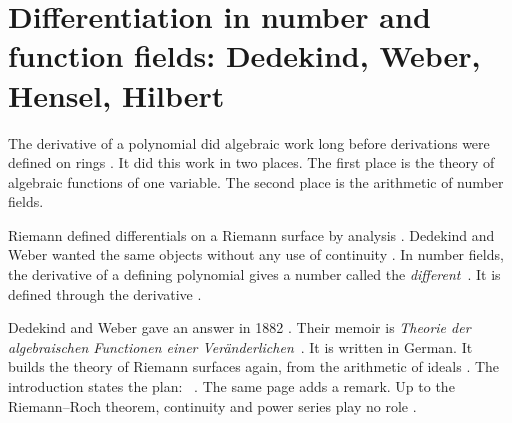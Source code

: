 \section[Differentiation in number and function fields: Dedekind, Weber, Hensel, Hilbert][Number and function fields]{Differentiation in number and function fields: Dedekind, Weber, Hensel, Hilbert}\label{sec:origins:function-fields}

The derivative of a polynomial did algebraic work long before derivations were
defined on rings \cite[\S 3, p.~179]{Hilbert1897}. It did this work in two
places. The first place is the theory of algebraic functions of one variable.
The second place is the arithmetic of number fields.

Riemann defined differentials on a Riemann surface by analysis \cite[\S 3,
p.~179]{Hilbert1897}. Dedekind and Weber wanted the same objects without any
use of continuity \cite[\S 3, p.~179]{Hilbert1897}. In number fields, the
derivative of a defining polynomial gives a number called the
\emph{different}~\cite[\S 3, p.~179]{Hilbert1897}. It is defined through the
derivative \cite[\S 3, p.~179]{Hilbert1897}.

Dedekind and Weber gave an answer in 1882 \cite{DedekindWeber1882}. Their
memoir is \emph{Theorie der algebraischen Functionen einer
Ver\"anderlichen}~\cite{DedekindWeber1882}. It is written in German. It builds
the theory of Riemann surfaces again, from the arithmetic of ideals
\cite{DedekindWeber1882}. The introduction states the plan: %
~\cite[p.~183]{DedekindWeber1882}. The same page adds a remark. Up to the
Riemann--Roch theorem, continuity and power series play no role
\cite[p.~183]{DedekindWeber1882}.

